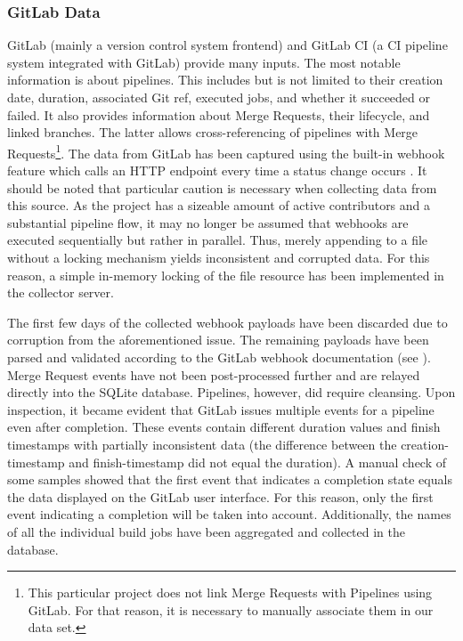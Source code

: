\subsubsection{GitLab Data}
    GitLab (mainly a version control system frontend) and GitLab CI (a CI pipeline system integrated with GitLab) provide many inputs. The most notable information is about pipelines. This includes but is not limited to their creation date, duration, associated Git ref, executed jobs, and whether it succeeded or failed. It also provides information about Merge Requests, their lifecycle, and linked branches. The latter allows cross-referencing of pipelines with Merge Requests\footnote{This particular project does not link Merge Requests with Pipelines using GitLab. For that reason, it is necessary to manually associate them in our data set.}. The data from GitLab has been captured using the built-in webhook feature which calls an HTTP endpoint every time a status change occurs \cite{gitlab-webhook}. It should be noted that particular caution is necessary when collecting data from this source. As the project has a sizeable amount of active contributors and a substantial pipeline flow, it may no longer be assumed that webhooks are executed sequentially but rather in parallel. Thus, merely appending to a file without a locking mechanism yields inconsistent and corrupted data. For this reason, a simple in-memory locking of the file resource has been implemented in the collector server.
    
    The first few days of the collected webhook payloads have been discarded due to corruption from the aforementioned issue. The remaining payloads have been parsed and validated according to the GitLab webhook documentation (see \cite{gitlab-webhook}). Merge Request events have not been post-processed further and are relayed directly into the SQLite database. Pipelines, however, did require cleansing. Upon inspection, it became evident that GitLab issues multiple events for a pipeline even after completion. These events contain different duration values and finish timestamps with partially inconsistent data (the difference between the creation-timestamp and finish-timestamp did not equal the duration). A manual check of some samples showed that the first event that indicates a completion state equals the data displayed on the GitLab user interface. For this reason, only the first event indicating a completion will be taken into account. Additionally, the names of all the individual build jobs have been aggregated and collected in the database.
    
